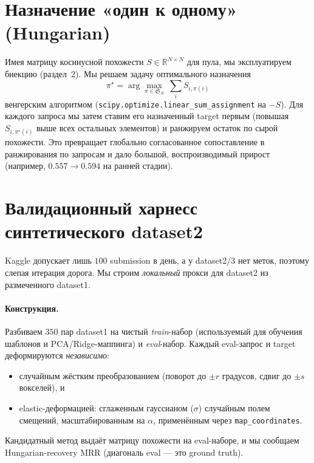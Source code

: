 \documentclass[11pt]{article}
\newcommand{\code}[1]{\texttt{#1}}
\newcommand{\R}{\mathbb{R}}
\begin{document}
\section{Назначение «один к одному» (Hungarian)}\label{sec:hungarian}

Имея матрицу косинусной похожести $S\in\R^{N\times N}$ для пула, мы эксплуатируем
биекцию (раздел~2). Мы решаем задачу оптимального назначения
\begin{equation}
\pi^\star=\arg\max_{\pi\in \mathfrak{S}_N}\ \sum_{i} S_{i,\pi(i)}
\end{equation}
венгерским алгоритмом (\code{scipy.optimize.linear\_sum\_assignment} на
$-S$). Для каждого запроса мы затем ставим его назначенный target первым (повышая
$S_{i,\pi^\star(i)}$ выше всех остальных элементов) и ранжируем остаток по сырой
похожести. Это превращает глобально согласованное сопоставление в ранжирования по
запросам и дало большой, воспроизводимый прирост (например, $0.557\to0.594$ на ранней
стадии).

\section{Валидационный харнесс синтетического dataset2}\label{sec:harness}

Kaggle допускает лишь $100$ submission в день, а у dataset2/3 нет меток, поэтому
слепая итерация дорога. Мы строим \emph{локальный} прокси для dataset2 из размеченного
dataset1.

\paragraph{Конструкция.} Разбиваем $350$ пар dataset1 на чистый \emph{train}-набор
(используемый для обучения шаблонов и PCA/Ridge-маппинга) и \emph{eval}-набор. Каждый
eval-запрос и target деформируются \emph{независимо}:
\begin{itemize}[nosep]
  \item случайным жёстким преобразованием (поворот до $\pm r$ градусов, сдвиг до
        $\pm s$ вокселей), и
  \item elastic-деформацией: сглаженным гауссианом ($\sigma$) случайным полем смещений,
        масштабированным на $\alpha$, применённым через \code{map\_coordinates}.
\end{itemize}
Кандидатный метод выдаёт матрицу похожести на eval-наборе, и мы сообщаем
Hungarian-recovery MRR (диагональ eval — это ground truth).
\end{document}
